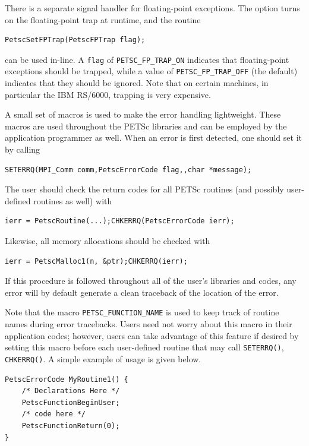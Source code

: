 {{There is a separate signal handler for floating-point exceptions.
 
The option  turns on the floating-point trap at runtime,
and the routine  
\begin{lstlisting}
PetscSetFPTrap(PetscFPTrap flag);
\end{lstlisting}
can be used in-line.
A \lstinline{flag} of \lstinline{PETSC_FP_TRAP_ON} 
indicates that floating-point exceptions should be trapped,
while a value of \lstinline{PETSC_FP_TRAP_OFF} (the default) indicates that they
should be ignored.  Note that on certain machines, in particular
the IBM RS/6000, trapping is very expensive.

A small set of macros is used to make the error handling lightweight.
These macros are used throughout the PETSc libraries and can be employed
by the application   
programmer as well.  When an error is first detected,
one should set it by calling
\begin{lstlisting}
SETERRQ(MPI_Comm comm,PetscErrorCode flag,,char *message);
\end{lstlisting}
The user should check the return codes for all PETSc routines (and
possibly user-defined routines as well) with
\begin{lstlisting}
ierr = PetscRoutine(...);CHKERRQ(PetscErrorCode ierr);
\end{lstlisting}
Likewise, all memory allocations should be checked with
\begin{lstlisting}
ierr = PetscMalloc1(n, &ptr);CHKERRQ(ierr);
\end{lstlisting}
If this procedure is followed throughout all of the user's libraries
and codes, any error will by default generate a clean traceback of
the location  
of the error.

Note that the macro \lstinline{PETSC_FUNCTION_NAME} is used to keep track of
routine names during error tracebacks.  Users need not worry about this
macro in their application codes; however, users can take advantage of this feature
if desired by setting this macro before each user-defined routine
that may call \lstinline{SETERRQ()}, \lstinline{CHKERRQ()}.
A simple example of usage is given below.
\begin{lstlisting}
PetscErrorCode MyRoutine1() { 
    /* Declarations Here */
    PetscFunctionBeginUser;
    /* code here */
    PetscFunctionReturn(0);
}
\end{lstlisting}

}}

